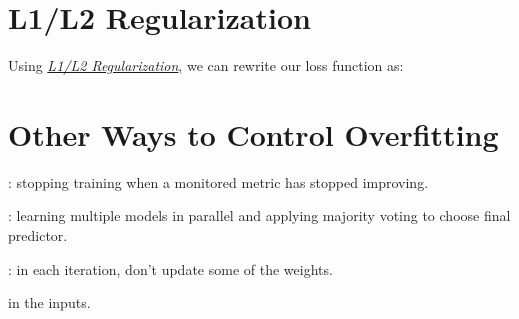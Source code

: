 \documentclass[
	number={5},
	title={Linear Regression}
]{cs584notes}
\begin{document}
\section{L1/L2 Regularization}\label{sec:l1/l2-regularization}
Using \emph{\hyperref[sec:regularization]{L1/L2 Regularization}}, we can rewrite our loss function as:

\section{Other Ways to Control Overfitting}\label{sec:other-ways-to-control-overfitting}
\begin{description}[font=\emph]
	\item[Early-stopping]: stopping training when a monitored metric has stopped improving.
	\item[Bagging]: learning multiple models in parallel and applying majority voting to choose final predictor.
	\item[Dropout]: in each iteration, don't update some of the weights.
	\item[Injecting noise] in the inputs.
\end{description}
\end{document}
